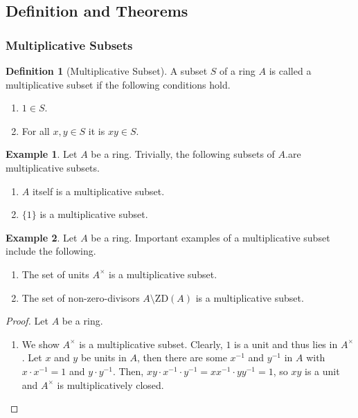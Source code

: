 \documentclass[a4paper]{book}
\theoremstyle{definition}
\newtheorem{definition}{Definition}[]
\newtheorem{example}{Example}[definition]
\begin{document}
\subsection*{Definition and Theorems}
\subsubsection{Multiplicative Subsets}


\begin{defbox}
    \begin{definition}[Multiplicative Subset]
        A subset \(S\) of a ring \(A\) is called a multiplicative subset if the following conditions hold.
        \begin{enumerate}
            \item \(1 \in S\).
            \item For all \(x, y \in S\) it is \(xy \in S\).
        \end{enumerate}
    \end{definition}
\end{defbox}

\begin{exmbox}
    \begin{example}
        Let \(A\) be a ring. Trivially, the following subsets of \(A\).are multiplicative subsets.
        \begin{enumerate}
            \item \(A\) itself is a multiplicative subset.
            \item \(\{1\}\) is a multiplicative subset.
        \end{enumerate}
    \end{example}
\end{exmbox}

\begin{exmbox}
    \begin{example}
        Let \(A\) be a ring. Important examples of a multiplicative subset include the following.
        \begin{enumerate}
            \item The set of units \(A^\times\) is a multiplicative subset.
            \item The set of non-zero-divisors \(A \setminus \mathrm{ZD}(A)\) is a multiplicative subset.
        \end{enumerate}
    \end{example}
\end{exmbox}

\begin{proof}
    Let \(A\) be a ring.
    \begin{enumerate}
        \item We show \(A^\times\) is a multiplicative subset. Clearly, \(1\) is a unit and thus lies in \(A^\times\). Let \(x\) and \(y\) be units in \(A\), then there are some \(x^{-1}\) and \(y^{-1}\) in \(A\) with \(x \cdot x^{-1} = 1\) and \(y \cdot y^{-1}\). Then, \(xy \cdot x^{-1} \cdot y^{-1} = x x^{-1} \cdot y y^{-1} = 1\), so \(xy\) is a unit and \(A^\times\) is multiplicatively closed.
    \end{enumerate}
\end{proof}
\end{document}
